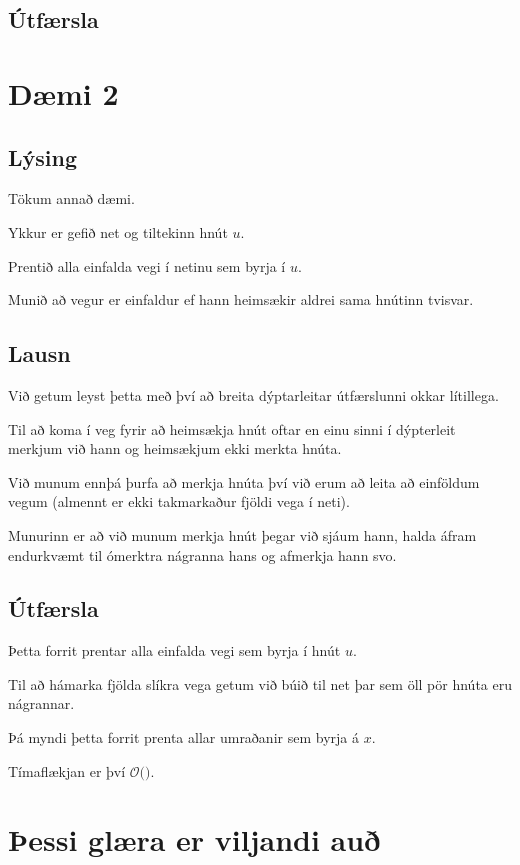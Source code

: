 \subsection{Útfærsla}
{
}

\section{Dæmi 2}
\subsection{Lýsing}
{
    {
        \item<1-> Tökum annað dæmi.
        \item<2-> Ykkur er gefið net og tiltekinn hnút $u$.
        \item<3-> Prentið alla einfalda vegi í netinu sem byrja í $u$.
        \item<4-> Munið að vegur er einfaldur ef hann heimsækir aldrei sama hnútinn tvisvar.
    }
}

\subsection{Lausn}
{
    {
        \item<1-> Við getum leyst þetta með því að breita dýptarleitar útfærslunni okkar lítillega.
        \item<2-> Til að koma í veg fyrir að heimsækja hnút oftar en einu sinni í dýpterleit merkjum við hann og heimsækjum ekki merkta hnúta.
        \item<3-> Við munum ennþá þurfa að merkja hnúta því við erum að leita að einföldum vegum (almennt er ekki takmarkaður fjöldi vega í neti).
        \item<4-> Munurinn er að við munum merkja hnút þegar við sjáum hann, halda áfram endurkvæmt til ómerktra nágranna hans og afmerkja hann svo.
    }
}

\subsection{Útfærsla}
{
    {
        \item<1->[]    
        \item<2-> Þetta forrit prentar alla einfalda vegi sem byrja í hnút $u$.
        \item<3-> Til að hámarka fjölda slíkra vega getum við búið til net þar sem öll pör hnúta eru nágrannar.
        \item<4-> Þá myndi þetta forrit prenta allar umraðanir sem byrja á $x$.
        \item<5-> Tímaflækjan er því $\mathcal{O}($$)$.
    }
}

\section{Þessi glæra er viljandi auð}
{
}



